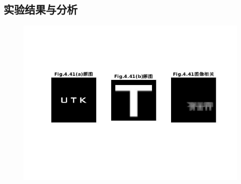 \documentclass[logo,reportComp]{thesis}
\begin{document}
\subsection{实验结果与分析}
\begin{figure}[H]
\centering
\includegraphics[width=\linewidth]{fig/05.jpg}
\end{figure}

\appendix\appendixconfig
\end{document}
